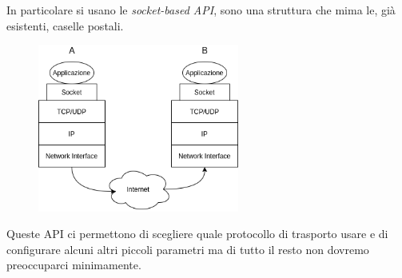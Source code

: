 In particolare si usano le \emph{socket-based API}, sono una struttura che mima le, già esistenti, caselle postali.

\begin{figure}[H]
    \centering
    \includegraphics[width=250px]{images/2_Applicazioni_di_rete/socket.png}
\end{figure}

Queste API ci permettono di scegliere quale protocollo di trasporto usare e di configurare alcuni altri piccoli parametri ma di tutto il resto non dovremo preoccuparci minimamente.

